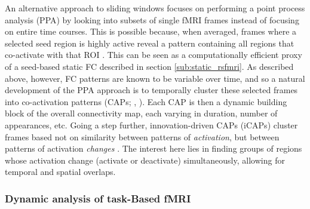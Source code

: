 An alternative approach to sliding windows focuses on performing a point process analysis (PPA) by looking into subsets of single fMRI frames instead of focusing on entire time courses. This is possible because, when averaged, frames where a selected seed region is highly active reveal a pattern containing all regions that co-activate with that ROI \citep{Tagliazucchi2012}. This can be seen as a computationally efficient proxy of a seed-based static FC described in section \ref{sub:static_rsfmri}. As described above, however, FC patterns are known to be variable over time, and so a natural development of the PPA approach is to temporally cluster these selected frames into co-activation patterns (CAPs; \citeauthor{Liu2018}, \citeyear{Liu2018}). Each CAP is then a dynamic building block of the overall connectivity map, each varying in duration, number of appearances, etc. Going a step further, innovation-driven CAPs (iCAPs) cluster frames based not on similarity between patterns of \textit{activation}, but between patterns of activation  \textit{changes} \citep{Karahanoglu2015a}. The interest here lies in finding groups of regions whose activation change (activate or deactivate) simultaneously, allowing for temporal and spatial overlaps.     

\subsubsection{Dynamic analysis of task-Based fMRI}

